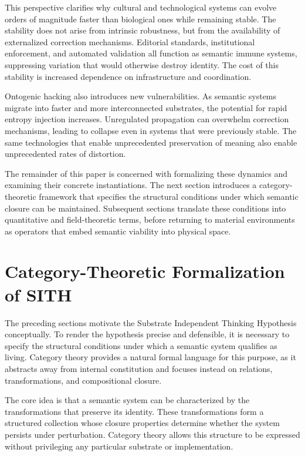 \documentclass[11pt,oneside]{article}
\begin{document}
This perspective clarifies why cultural and technological systems can evolve orders of magnitude faster than biological ones while remaining stable. The stability does not arise from intrinsic robustness, but from the availability of externalized correction mechanisms. Editorial standards, institutional enforcement, and automated validation all function as semantic immune systems, suppressing variation that would otherwise destroy identity. The cost of this stability is increased dependence on infrastructure and coordination.

Ontogenic hacking also introduces new vulnerabilities. As semantic systems migrate into faster and more interconnected substrates, the potential for rapid entropy injection increases. Unregulated propagation can overwhelm correction mechanisms, leading to collapse even in systems that were previously stable. The same technologies that enable unprecedented preservation of meaning also enable unprecedented rates of distortion.

The remainder of this paper is concerned with formalizing these dynamics and examining their concrete instantiations. The next section introduces a category-theoretic framework that specifies the structural conditions under which semantic closure can be maintained. Subsequent sections translate these conditions into quantitative and field-theoretic terms, before returning to material environments as operators that embed semantic viability into physical space.


\section{Category-Theoretic Formalization of SITH} 

The preceding sections motivate the Substrate Independent Thinking Hypothesis conceptually. To render the hypothesis precise and defensible, it is necessary to specify the structural conditions under which a semantic system qualifies as living. Category theory provides a natural formal language for this purpose, as it abstracts away from internal constitution and focuses instead on relations, transformations, and compositional closure.

The core idea is that a semantic system can be characterized by the transformations that preserve its identity. These transformations form a structured collection whose closure properties determine whether the system persists under perturbation. Category theory allows this structure to be expressed without privileging any particular substrate or implementation.
\end{document}
